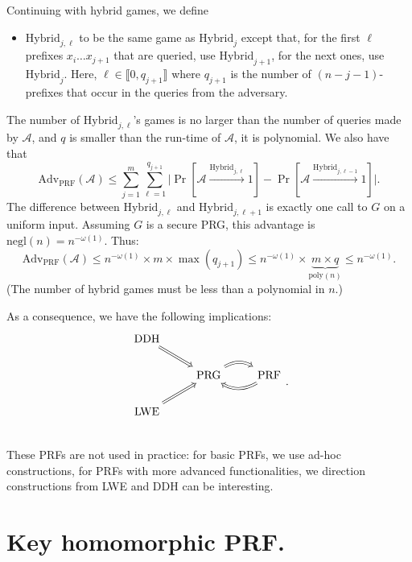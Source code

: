 \documentclass[./main]{subfiles}
\begin{document}
\begin{prv}
    Continuing with hybrid games, we define
    \begin{itemize}
      \item $\mathrm{Hybrid}_{j,\ell}$ to be the same game as $\mathrm{Hybrid}_j$ except that, for the first $\ell$ prefixes $x_i \ldots x_{j+1}$ that are queried, use $\mathrm{Hybrid}_{j+1}$, for the next ones, use $\mathrm{Hybrid}_j$.
        Here, $\ell \in \llbracket 0, q_{j+1}\rrbracket$ where $q_{j+1}$ is the number of $(n-j-1)$-prefixes that occur in the queries from the adversary.
    \end{itemize}
    The number of $\mathrm{Hybrid}_{j,\ell}$'s games is no larger than the number of queries made by $\mathcal{A}$, and $q$ is smaller than the run-time of $\mathcal{A}$, it is polynomial.
    We also have that
    \[
    \mathrm{Adv}_{\mathrm{PRF}}(\mathcal{A}) \le \sum_{j=1}^m \sum_{\ell=1}^{q_{j+1}} \big|
    \Pr[\mathcal{A} \xrightarrow{\mathrm{Hybrid}_{j,\ell}} 1]
    -
    \Pr[\mathcal{A} \xrightarrow{\mathrm{Hybrid}_{j,\ell-1}} 1]
    \big|
    .\]
    The difference between $\mathrm{Hybrid}_{j, \ell}$ and $\mathrm{Hybrid}_{j, \ell+1}$ is exactly one call to $G$ on a uniform input.
    Assuming $G$ is a secure  PRG, this advantage is $\mathrm{negl}(n) = n^{-\omega(1)}$.
    Thus:
    \[
      \mathrm{Adv}_\mathrm{PRF}(\mathcal{A}) \le n^{-\omega(1)} \times m \times \max(q_{j+1}) \le n^{-\omega(1)} \times \underbrace{m \times q}_{\mathrm{poly}(n)} \le n^{-\omega(1)}
    .\]
    (The number of hybrid games must be less than a polynomial in $n$.)
  \end{prv}

  As a consequence, we have the following implications:
  \[
  \begin{tikzcd}
    \text{DDH} \arrow[Rightarrow]{dr}{} \\
    & \text{PRG} \arrow[Rightarrow, bend left]{r}{} & \text{PRF} \arrow[Rightarrow, bend left]{l}{}\\
    \text{LWE} \arrow[Rightarrow]{ur}{} \\
  \end{tikzcd}
  .\]
  These PRFs are not used in practice: for basic PRFs, we use ad-hoc constructions, for PRFs with more advanced functionalities, we direction constructions from LWE and DDH can be interesting.


  \section{Key homomorphic PRF.}
\end{document}
